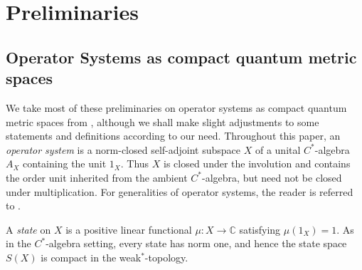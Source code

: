 \documentclass[a4paper,11pt,reqno]{amsart}
\theoremstyle{plain}
\theoremstyle{mainthmstyle}
\theoremstyle{named}
\numberwithin{equation}{section}
\begin{document}

\section{Preliminaries}
\subsection{Operator Systems as compact quantum metric spaces}

We take most of these preliminaries on operator systems as compact quantum metric spaces from \cite{Kaad-Kyed}, although we shall make slight adjustments to some statements and definitions according to our need. Throughout this paper, an \emph{operator system} is a norm-closed self-adjoint subspace
\(X\) of a unital \(C^{*}\)-algebra \(A_{X}\) containing the unit \(1_{X}\).
Thus \(X\) is closed under the involution and contains the order unit inherited
from the ambient \(C^{*}\)-algebra, but need not be closed under multiplication. For generalities of operator systems, the reader is referred to \cite{arveson1990operator}.

A \emph{state} on \(X\) is a positive linear functional
\(\mu:X\to \mathbb{C}\) satisfying \(\mu(1_{X})=1\).
As in the \(C^{*}\)-algebra setting, every state has norm one, and hence the
state space \(S(X)\) is compact in the weak$^{\ast}$-topology.


\end{document}
